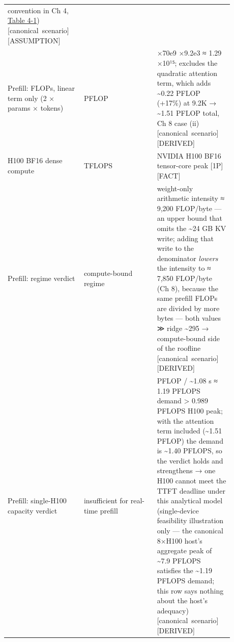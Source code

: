\begin{longtable}[]{@{}
  >{\raggedright\arraybackslash}p{0.2927\linewidth}
  >{\raggedright\arraybackslash}p{0.2927\linewidth}
  >{\raggedright\arraybackslash}p{0.2927\linewidth}@{}}
convention in Ch 4, \hyperref[tab:4.1]{Table 4-1}) \mbox{{[}canonical
scenario{]}}\hspace{0pt}\mbox{{[}ASSUMPTION{]}} \\
Prefill: FLOPs, linear term only (2 × params × tokens) & 1.29 PFLOP & 2
×70e9 ×9.2e3 ≈ 1.29 ×10¹⁵; excludes the quadratic attention term, which
adds \textasciitilde0.22 PFLOP (+17\%) at 9.2K → \textasciitilde1.51
PFLOP total, Ch 8 case (ii) \mbox{{[}canonical scenario{]}}\hspace{0pt}\mbox{{[}DERIVED{]}} \\
H100 BF16 dense compute & 989 TFLOPS & NVIDIA H100 BF16 tensor-core peak
\mbox{{[}1P{]}}\hspace{0pt}\mbox{{[}FACT{]}} \\
Prefill: regime verdict & compute-bound regime & weight-only arithmetic
intensity ≈ 9,200 FLOP/byte --- an upper bound that omits the
\textasciitilde24 GB KV write; adding that write to the denominator
\emph{lowers} the intensity to ≈ 7,850 FLOP/byte (Ch 8), because the
same prefill FLOPs are divided by more bytes --- both values ≫ ridge
\textasciitilde295 → compute-bound side of the roofline \mbox{{[}canonical
scenario{]}}\hspace{0pt}\mbox{{[}DERIVED{]}} \\
Prefill: single-H100 capacity verdict & insufficient for real-time
prefill & 1.29 PFLOP / \textasciitilde1.08 s ≈ 1.19 PFLOPS demand
\textgreater{} 0.989 PFLOPS H100 peak; with the attention term included
(\textasciitilde1.51 PFLOP) the demand is \textasciitilde1.40 PFLOPS, so
the verdict holds and strengthens → one H100 cannot meet the TTFT
deadline under this analytical model (single-device feasibility
illustration only --- the canonical 8×H100 host's aggregate peak of
\textasciitilde7.9 PFLOPS satisfies the \textasciitilde1.19 PFLOPS
demand; this row says nothing about the host's adequacy) \mbox{{[}canonical
scenario{]}}\hspace{0pt}\mbox{{[}DERIVED{]}} \\
\end{longtable}

